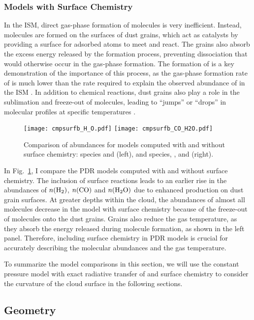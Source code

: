 \documentclass[12pt,a4paper]{article}
\newcommand{\qt}[1]{\textcolor{red}{#1}}
\begin{document}
\subsubsection{Models with Surface Chemistry}
In the ISM, direct gas-phase formation of molecules is very inefficient. Instead, molecules are formed on the surfaces of dust grains, which act as catalysts by providing a surface for adsorbed atoms to meet and react. The grains also absorb the excess energy released by the formation process, preventing dissociation that would otherwise occur in the gas-phase formation. The formation of  is a key demonstration of the importance of this process, as the gas-phase formation rate of  is much lower than the rate required to explain the observed abundance of  in the ISM \parencite{Gould1963,Hollenbach1971}. In addition to chemical reactions, dust grains also play a role in the sublimation and freeze-out of molecules, leading to “jumps” or “drops” in molecular profiles at specific temperatures \parencite{Herbst2009}.

\begin{figure}[h]
    \centering
    \texttt{[image: cmpsurfb\_H\_O.pdf]}
    \texttt{[image: cmpsurfb\_CO\_H2O.pdf]}
    \caption{Comparison of abundances for models computed with and without surface chemistry:  species and  (left), and  species, , and  (right).} \label{fig:cmpsurfb}
\end{figure}

In Fig.~\ref{fig:cmpsurfb}, I compare the PDR models computed with and without surface chemistry. The inclusion of surface reactions leads to an earlier rise in the abundances of $n(\ce{H2})$, $n(\ce{CO})$ and $n(\ce{H2O})$ due to enhanced production on dust grain surfaces. At greater depths within the cloud, the abundances of almost all molecules decrease in the model with surface chemistry because of the freeze-out of molecules onto the dust grains. Grains also reduce the gas temperature, as they absorb the energy released during molecule formation, as shown in the left panel. Therefore, including surface chemistry in PDR models is crucial for accurately describing the molecular abundances and the gas temperature.

To summarize the model comparisons in this section, we will use the constant pressure model with exact radiative transfer of  and surface chemistry to consider the curvature of the cloud surface in the following sections.

\subsection{Geometry}
\end{document}
